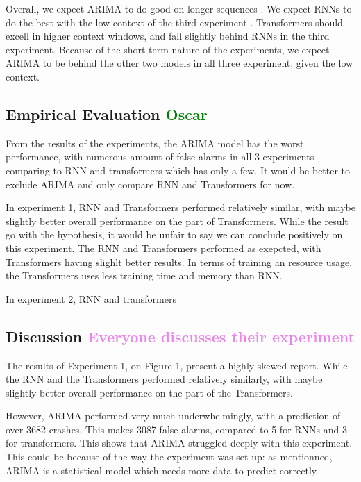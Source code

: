 \documentclass[12pt, letterpaper]{article}
\begin{document}
    
Overall, we expect ARIMA to do good on longer sequences \cite{ho2021}. We expect RNNs to do the best with the low context of the third experiment \cite{Hansika}. Transformers should excell in higher context windows, and fall slightly behind RNNs in the third experiment. Because of the short-term nature of the experiments, we expect ARIMA to be behind the other two models in all three experiment, given the low context.
\subsection*{Empirical Evaluation \textcolor{green}{Oscar}}
From the results of the experiments, the ARIMA model has the worst performance, with numerous amount of false alarms in all 3 experiments comparing to RNN and transformers which has only a few. It would be better to exclude ARIMA and only compare RNN and Transformers for now.

In experiment 1, RNN and Transformers performed relatively similar, with maybe slightly better overall performance on the part of Transformers. While the result go with the hypothesis, it would be unfair to say we can conclude positively on this experiment. The RNN and Transformers performed as exepcted, with Transformers having slighlt better results.
In terms of training an resource usage, the Transformers uses less training time and memory than RNN. 

In experiment 2, RNN and transformers 
\subsection*{Discussion \textcolor{violet}{Everyone discusses their experiment}}

The results of Experiment 1, on Figure 1, present a highly skewed report. While the RNN and the Transformers performed relatively similarly, with maybe slightly better overall performance on the part of the Transformers.

However, ARIMA performed very much underwhelmingly, with a prediction of over 3682 crashes. This makes 3087 false alarms, compared to 5 for RNNs and 3 for transformers. This shows that ARIMA struggled deeply with this experiment. This could be because of the way the experiment was set-up: as mentionned, ARIMA is a statistical model which needs more data to predict correctly.
\end{document}
